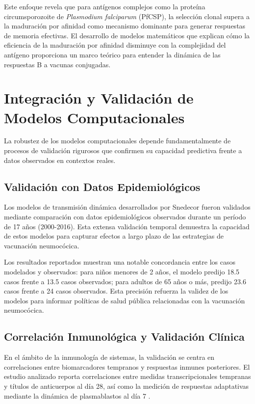 Este enfoque revela que para antígenos complejos como la proteína circumsporozoite de \textit{Plasmodium falciparum} (PfCSP), la selección clonal supera a la maduración por afinidad como mecanismo dominante para generar respuestas de memoria efectivas. El desarrollo de modelos matemáticos que explican cómo la eficiencia de la maduración por afinidad disminuye con la complejidad del antígeno proporciona un marco teórico para entender la dinámica de las respuestas B a vacunas conjugadas.


\section{Integración y Validación de Modelos Computacionales}

La robustez de los modelos computacionales depende fundamentalmente de procesos de validación rigurosos que confirmen su capacidad predictiva frente a datos observados en contextos reales.

\subsection{Validación con Datos Epidemiológicos}

Los modelos de transmisión dinámica desarrollados por Snedecor \cite{Snedecor2020a} fueron validados mediante comparación con datos epidemiológicos observados durante un período de 17 años (2000-2016). Esta extensa validación temporal demuestra la capacidad de estos modelos para capturar efectos a largo plazo de las estrategias de vacunación neumocócica.

Los resultados reportados muestran una notable concordancia entre los casos modelados y observados: para niños menores de 2 años, el modelo predijo 18.5 casos frente a 13.5 casos observados; para adultos de 65 años o más, predijo 23.6 casos frente a 24 casos observados. Esta precisión refuerza la validez de los modelos para informar políticas de salud pública relacionadas con la vacunación neumocócica.

\subsection{Correlación Inmunológica y Validación Clínica}

En el ámbito de la inmunología de sistemas, la validación se centra en correlaciones entre biomarcadores tempranos y respuestas inmunes posteriores. El estudio analizado reporta correlaciones entre medidas transcripcionales tempranas y títulos de anticuerpos al día 28, así como la medición de respuestas adaptativas mediante la dinámica de plasmablastos al día 7 \cite{Obermoser2013}.

